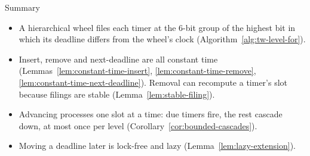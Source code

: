 \begin{quotebox}{Summary}
    \begin{itemize}
        \item A hierarchical wheel files each timer at the 6-bit group of the highest bit in which its deadline differs from the wheel's clock (Algorithm~\ref{alg:tw-level-for}).
        \item Insert, remove and next-deadline are all constant time (Lemmas~\ref{lem:constant-time-insert}, \ref{lem:constant-time-remove}, \ref{lem:constant-time-next-deadline}). Removal can recompute a timer's slot because filings are stable (Lemma~\ref{lem:stable-filing}).
        \item Advancing processes one slot at a time: due timers fire, the rest cascade down, at most once per level (Corollary~\ref{cor:bounded-cascades}).
        \item Moving a deadline later is lock-free and lazy (Lemma~\ref{lem:lazy-extension}).
    \end{itemize}
\end{quotebox}

